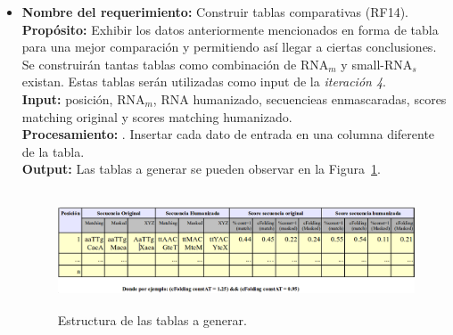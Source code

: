 \documentclass[12pt,a4paper,spanish]{article}
\begin{document}
\begin{itemize}
		\item \textbf{Nombre del requerimiento:} Construir tablas comparativas (RF14).\\
 	    \textbf{Propósito:} Exhibir los datos anteriormente mencionados en forma de tabla para una mejor comparación y 								permitiendo así llegar a ciertas conclusiones. Se construirán tantas tablas como combinación 								de RNA$_m$ y small-RNA$_s$ existan. Estas tablas serán utilizadas como input de la
							\emph{iteración 4}.\\
		\textbf{Input:} posición, RNA$_m$, RNA humanizado, secuencieas enmascaradas, scores matching original y scores 							matching humanizado.\\
		\textbf{Procesamiento:} . Insertar cada dato de entrada en una columna diferente de la tabla.\\
		\textbf{Output:} Las tablas a generar se pueden observar en la Figura~\ref{table}.
			\vskip 0.5cm
			\begin{figure}[h]
				\begin{center}
					\includegraphics[width=6.2638in,height=1.3744in]{images/table.png}
					\caption{Estructura de las tablas a generar.}
					\label{table}
				\end{center}
			\end{figure}
		

\end{itemize}
\end{document}
